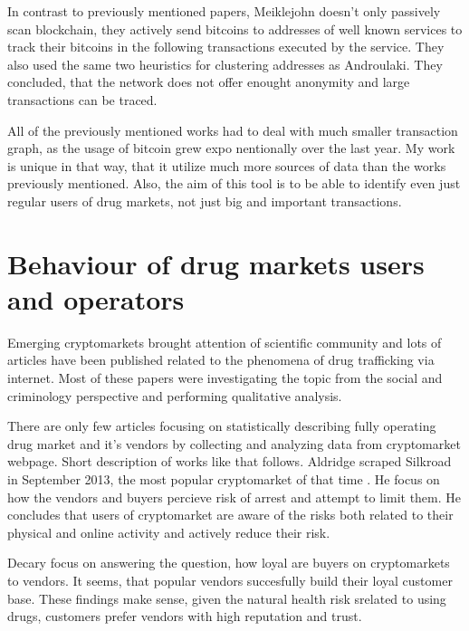 \documentclass[
  digital, %
  table,   %
  lof,     %
  lot,     %
  oneside
]{fithesis3}
\begin{document}
In contrast to previously mentioned papers, Meiklejohn \parencite{meiklejohn2013fistful} 
doesn't only passively scan blockchain, they actively send bitcoins to addresses of
well known services to track their bitcoins in the following transactions executed by the service.
They also used the same two heuristics for clustering addresses
as Androulaki. \parencite{androulaki2013evaluating}
They concluded, that the network does not offer enought anonymity and large transactions can be traced.

All of the previously mentioned works had to deal with much smaller transaction graph, as the usage of bitcoin grew expo
nentionally over the last year. 
My work is unique in that way, that it utilize much more sources of data than the works previously mentioned. Also, the 
aim of this tool is to be able
to identify even just regular users of drug markets, not just big and important transactions.

\section{Behaviour of drug markets users and operators}

Emerging cryptomarkets brought attention of scientific community
and lots of articles have been published related to the phenomena of drug trafficking via internet.
Most of these papers were investigating the topic from the social
and criminology perspective and performing qualitative analysis.
\parencite{aldridge2014not}
\parencite{barratt2014use}
\parencite{christin2013traveling}
\parencite{dolliver2015criminogenic}
\parencite{van2013silk}
\parencite{walsh2011drugs}
\parencite{martin2014lost}

There are only few articles focusing on statistically describing fully operating drug market and it's vendors
by collecting and analyzing data from cryptomarket webpage. Short description of works like that follows.
Aldridge \parencite{aldridge2017delivery} scraped Silkroad in September 2013, the most popular cryptomarket of that time
.
He focus on how the vendors and buyers percieve risk of arrest and attempt to limit them.
He concludes that users of cryptomarket are aware of the risks both related to their physical and online activity
and actively reduce their risk.

Decary \parencite{decary2017repeat} focus on answering the question, how loyal are buyers 
on cryptomarkets to vendors. It seems, that popular vendors succesfully build their loyal
customer base. These findings make sense, given the natural health risk srelated to using drugs,
customers prefer vendors with high reputation and trust.
\end{document}
